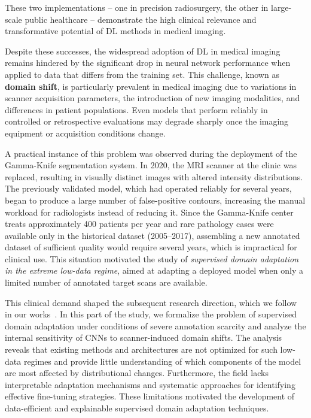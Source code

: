 These two implementations -- one in precision radiosurgery, the other in large-scale public healthcare -- demonstrate the high clinical relevance and transformative potential of DL methods in medical imaging.

Despite these successes, the widespread adoption of DL in medical imaging remains hindered by the significant drop in neural network performance when applied to data that differs from the training set. This challenge, known as \textbf{domain shift}, is particularly prevalent in medical imaging due to variations in scanner acquisition parameters, the introduction of new imaging modalities, and differences in patient populations. Even models that perform reliably in controlled or retrospective evaluations may degrade sharply once the imaging equipment or acquisition conditions change.

A practical instance of this problem was observed during the deployment of the Gamma-Knife segmentation system. In 2020, the MRI scanner at the clinic was replaced, resulting in visually distinct images with altered intensity distributions. The previously validated model, which had operated reliably for several years, began to produce a large number of false-positive contours, increasing the manual workload for radiologists instead of reducing it. Since the Gamma-Knife center treats approximately 400 patients per year and rare pathology cases were available only in the historical dataset (2005–2017), assembling a new annotated dataset of sufficient quality would require several years, which is impractical for clinical use. This situation motivated the study of \textit{supervised domain adaptation in the extreme low-data regime}, aimed at adapting a deployed model when only a limited number of annotated target scans are available.

This clinical demand shaped the subsequent research direction, which we follow in our works~\cite{shirokikh2020first,zakazov2021anatomy}. In this part of the study, we formalize the problem of supervised domain adaptation under conditions of severe annotation scarcity and analyze the internal sensitivity of CNNs to scanner-induced domain shifts. The analysis reveals that existing methods and architectures are not optimized for such low-data regimes and provide little understanding of which components of the model are most affected by distributional changes. Furthermore, the field lacks interpretable adaptation mechanisms and systematic approaches for identifying effective fine-tuning strategies. These limitations motivated the development of data-efficient and explainable supervised domain adaptation techniques.

